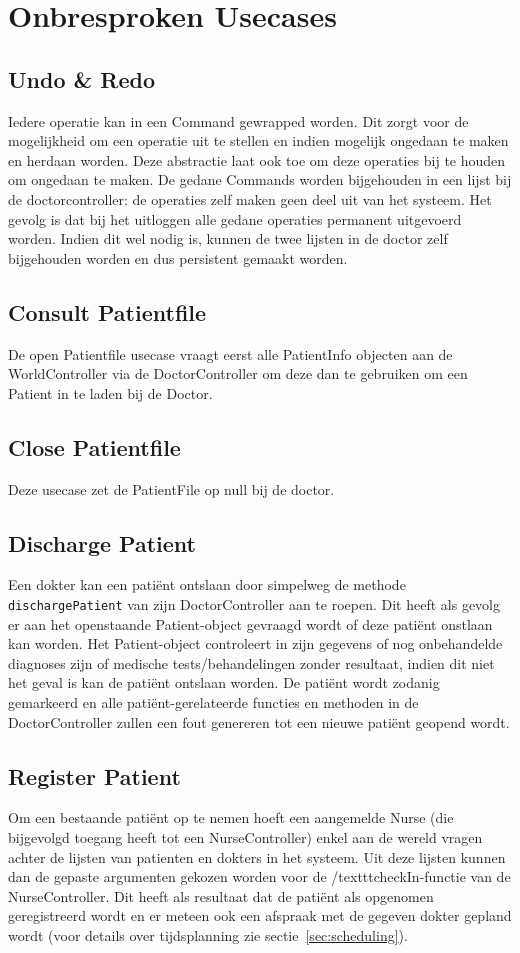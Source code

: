 \documentclass[a4paper]{article}
\begin{document}
\section{Onbresproken Usecases}
\subsection{Undo \& Redo}
Iedere operatie kan in een Command gewrapped worden. Dit zorgt voor de mogelijkheid om een operatie uit te stellen en indien mogelijk ongedaan te maken en herdaan worden. Deze abstractie laat ook toe om deze operaties bij te houden om ongedaan te maken. De gedane Commands worden bijgehouden in een lijst bij de doctorcontroller: de operaties zelf maken geen deel uit van het systeem. Het gevolg is dat bij het uitloggen alle gedane operaties permanent uitgevoerd worden. Indien dit wel nodig is, kunnen de twee lijsten in de doctor zelf bijgehouden worden en dus persistent gemaakt worden.

\subsection{Consult Patientfile}
De open Patientfile usecase vraagt eerst alle PatientInfo objecten aan de WorldController via de DoctorController om deze dan te gebruiken om een Patient in te laden bij de Doctor.

\subsection{Close Patientfile}
Deze usecase zet de PatientFile op null bij de doctor.

\subsection{Discharge Patient}
Een dokter kan een pati\"ent ontslaan door simpelweg de methode \texttt{dischargePatient} van zijn DoctorController aan te roepen. Dit heeft als gevolg er aan het openstaande Patient-object gevraagd wordt of deze pati\"ent onstlaan kan worden. Het Patient-object controleert in zijn gegevens of nog onbehandelde diagnoses zijn of medische tests/behandelingen zonder resultaat, indien dit niet het geval is kan de pati\"ent ontslaan worden.
De pati\"ent wordt zodanig gemarkeerd en alle pati\"ent-gerelateerde functies en methoden in de DoctorController zullen een fout genereren tot een nieuwe pati\"ent geopend wordt.
\subsection{Register Patient}
Om een bestaande pati\"ent op te nemen hoeft een aangemelde Nurse (die bijgevolgd toegang heeft tot een NurseController) enkel aan de wereld vragen achter de lijsten van patienten en dokters in het systeem. Uit deze lijsten kunnen dan de gepaste argumenten gekozen worden voor de /texttt{checkIn}-functie van de NurseController. Dit heeft als resultaat dat de pati\"ent als opgenomen geregistreerd wordt en er meteen ook een afspraak met de gegeven dokter gepland wordt (voor details over tijdsplanning zie sectie~\ref{sec:scheduling}).
\end{document}
